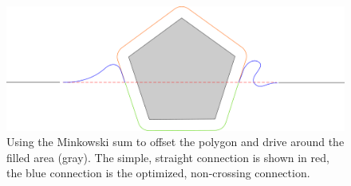 \begin{figure}
\includegraphics[width=\textwidth]{images/conclusion/minkowski_crossing_avoidance.pdf}
\caption{Using the Minkowski sum to offset the polygon and drive around the filled area (gray). The simple, straight connection is shown in red, the blue connection is the optimized, non-crossing connection.}
\end{figure}

